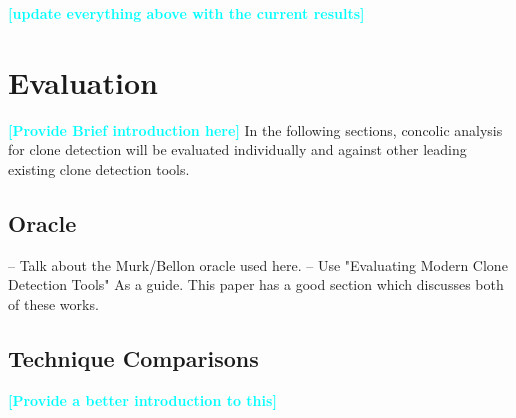 \documentclass[smallextended]{svjour3}       %
\newcommand{\todo}[1]{\textcolor{cyan}{\textbf{[#1]}}}
\begin{document}
\todo{update everything above with the current results}



\section{Evaluation}
\label{sec: evaluation}

\todo{Provide Brief introduction here}
In the following sections, concolic analysis for clone detection will be evaluated individually and against other leading existing clone detection tools.




\subsection{Oracle}


-- Talk about the Murk/Bellon oracle used here.
-- Use \cite{svajlenko2014evaluating} "Evaluating Modern Clone Detection Tools" As a guide. This paper has a good section which discusses both of these works.



\subsection{Technique Comparisons} %

\todo{Provide a better introduction to this}



\end{document}
